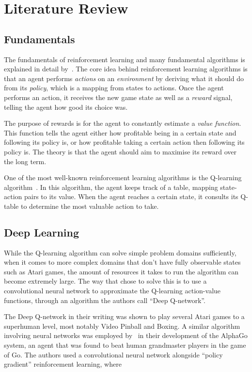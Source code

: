\documentclass[11pt,a4paper]{article}
\begin{document}
    \section{Literature Review}
    \subsection{Fundamentals}
    The fundamentals of reinforcement learning and many fundamental algorithms is explained in detail by~\cite{sutton18}.
    The core idea behind reinforcement learning algorithms is that an agent performs \emph{actions} on an \emph{environment} by deriving what it should do from its \emph{policy}, which is a mapping from states to actions.
    Once the agent performs an action, it receives the new game state as well as a \emph{reward} signal, telling the agent how good its choice was.

    The purpose of rewards is for the agent to constantly estimate a \emph{value function}.
    This function tells the agent either how profitable being in a certain state and following its policy is, or how profitable taking a certain action then following its policy is.
    The theory is that the agent should aim to maximise its reward over the long term.

    One of the most well-known reinforcement learning algorithms is the Q-learning algorithm~\cite[Chapter~6.5]{sutton18}.
    In this algorithm, the agent keeps track of a table, mapping state-action pairs to its value.
    When the agent reaches a certain state, it consults its Q-table to determine the most valuable action to take.

    \subsection{Deep Learning}
    While the Q-learning algorithm can solve simple problem domains sufficiently, when it comes to more complex domains that don't have fully observable states such as Atari games, the amount of resources it takes to run the algorithm can become extremely large. The way that \cite{mnih15} chose to solve this is to use a convolutional neural network to approximate the Q-learning action-value functions, through an algorithm the authors call ``Deep Q-network''.

    The Deep Q-network in their writing was shown to play several Atari games to a superhuman level, most notably Video Pinball and Boxing.
    A similar algorithm involving neural networks was employed by~\cite{silver16} in their development of the AlphaGo system, an agent that was found to beat human grandmaster players in the game of Go. The authors used a convolutional neural network alongside ``policy gradient'' reinforcement learning, where
\end{document}
